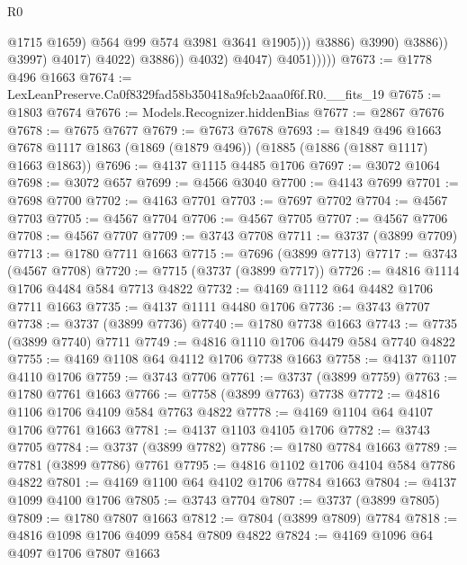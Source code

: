 \begin{lexlean}{R0}
\begin{coremodule}
                                            @1715
                                            @1659)
                                          @564
                                          @99
                                          @574
                                          @3981
                                          @3641
                                          @1905)))
                                    @3886)
                                  @3990)
                                @3886))
                            @3997)
                          @4017)
                        @4022)
                      @3886))
                  @4032)
                @4047)
              @4051)))))
@7673 := @1778 @496 @1663
@7674 := LexLeanPreserve.Ca0f8329fad58b350418a9fcb2aaa0f6f.R0.__fits_19
@7675 := @1803 @7674
@7676 := Models.Recognizer.hiddenBias
@7677 := @2867 @7676
@7678 := @7675 @7677
@7679 := @7673 @7678
@7693 := @1849
    @496
    @1663
    @7678
    @1117
    @1863
    (@1869 (@1879 @496))
    (@1885 (@1886 (@1887 @1117) @1663 @1863))
@7696 := @4137 @1115 @4485 @1706
@7697 := @3072 @1064
@7698 := @3072 @657
@7699 := @4566 @3040
@7700 := @4143 @7699
@7701 := @7698 @7700
@7702 := @4163 @7701
@7703 := @7697 @7702
@7704 := @4567 @7703
@7705 := @4567 @7704
@7706 := @4567 @7705
@7707 := @4567 @7706
@7708 := @4567 @7707
@7709 := @3743 @7708
@7711 := @3737 (@3899 @7709)
@7713 := @1780 @7711 @1663
@7715 := @7696 (@3899 @7713)
@7717 := @3743 (@4567 @7708)
@7720 := @7715 (@3737 (@3899 @7717))
@7726 := @4816 @1114 @1706 @4484 @584 @7713 @4822
@7732 := @4169 @1112 @64 @4482 @1706 @7711 @1663
@7735 := @4137 @1111 @4480 @1706
@7736 := @3743 @7707
@7738 := @3737 (@3899 @7736)
@7740 := @1780 @7738 @1663
@7743 := @7735 (@3899 @7740) @7711
@7749 := @4816 @1110 @1706 @4479 @584 @7740 @4822
@7755 := @4169 @1108 @64 @4112 @1706 @7738 @1663
@7758 := @4137 @1107 @4110 @1706
@7759 := @3743 @7706
@7761 := @3737 (@3899 @7759)
@7763 := @1780 @7761 @1663
@7766 := @7758 (@3899 @7763) @7738
@7772 := @4816 @1106 @1706 @4109 @584 @7763 @4822
@7778 := @4169 @1104 @64 @4107 @1706 @7761 @1663
@7781 := @4137 @1103 @4105 @1706
@7782 := @3743 @7705
@7784 := @3737 (@3899 @7782)
@7786 := @1780 @7784 @1663
@7789 := @7781 (@3899 @7786) @7761
@7795 := @4816 @1102 @1706 @4104 @584 @7786 @4822
@7801 := @4169 @1100 @64 @4102 @1706 @7784 @1663
@7804 := @4137 @1099 @4100 @1706
@7805 := @3743 @7704
@7807 := @3737 (@3899 @7805)
@7809 := @1780 @7807 @1663
@7812 := @7804 (@3899 @7809) @7784
@7818 := @4816 @1098 @1706 @4099 @584 @7809 @4822
@7824 := @4169 @1096 @64 @4097 @1706 @7807 @1663

\end{coremodule}
\end{lexlean}
